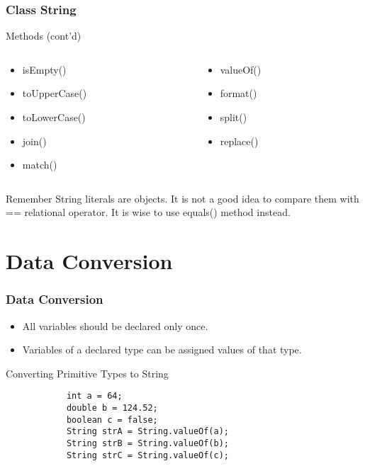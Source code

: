 \documentclass[10pt, compress]{beamer}
\begin{document}
\begin{frame}[fragile]
	\frametitle{Class String}
	\begin{block}{Methods (cont'd)}
		\begin{columns}
			\begin{column}{0.5\textwidth}
				\begin{itemize}
					\item[] isEmpty()
					\item[] toUpperCase()
					\item[] toLowerCase()
					\item[] join()
					\item[] match()
				\end{itemize}
			\end{column}
			\begin{column}{0.5\textwidth}
				\begin{itemize}
					\item[] valueOf()
					\item[] format()
					\item[] split()
					\item[] replace()
				\end{itemize}
			\end{column}
		\end{columns}
	\end{block}
	\begin{block}{Remember}
		String literals are objects. It is not a good idea to compare them with ={}= relational operator. It is wise to use equals() method instead.
	\end{block}
\end{frame}

\section{Data Conversion}

\begin{frame}[fragile]
	\frametitle{Data Conversion}
	\begin{itemize}
		\item[] All variables should be declared only once.
		\item[] Variables of a declared type can be assigned values of that type.
	\end{itemize}
	\begin{block}{Converting Primitive Types to String}
		\begin{verbatim}
			int a = 64;
			double b = 124.52;
			boolean c = false;
			String strA = String.valueOf(a);
			String strB = String.valueOf(b);
			String strC = String.valueOf(c);
		\end{verbatim}
	\end{block}
\end{frame}
\end{document}
